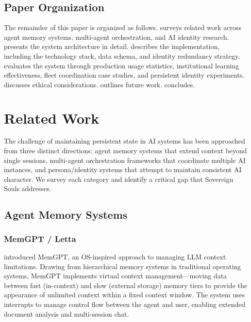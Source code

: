 \documentclass[11pt,a4paper]{article}
\begin{document}

\subsection{Paper Organization}
\label{sec:organization}

The remainder of this paper is organized as follows.  surveys related work across agent memory systems, multi-agent orchestration, and AI identity research.  presents the system architecture in detail.  describes the implementation, including the technology stack, data schema, and identity redundancy strategy.  evaluates the system through production usage statistics, institutional learning effectiveness, fleet coordination case studies, and persistent identity experiments.  discusses ethical considerations.  outlines future work.  concludes.



\section{Related Work}
\label{sec:related}

The challenge of maintaining persistent state in AI systems has been approached from three distinct directions: agent memory systems that extend context beyond single sessions, multi-agent orchestration frameworks that coordinate multiple AI instances, and persona/identity systems that attempt to maintain consistent AI character. We survey each category and identify a critical gap that Sovereign Souls addresses.


\subsection{Agent Memory Systems}
\label{sec:agent-memory}

\subsubsection{MemGPT / Letta}

\citet{packer2023memgpt} introduced MemGPT, an OS-inspired approach to managing LLM context limitations. Drawing from hierarchical memory systems in traditional operating systems, MemGPT implements virtual context management---moving data between fast (in-context) and slow (external storage) memory tiers to provide the appearance of unlimited context within a fixed context window. The system uses interrupts to manage control flow between the agent and user, enabling extended document analysis and multi-session chat.
\end{document}
